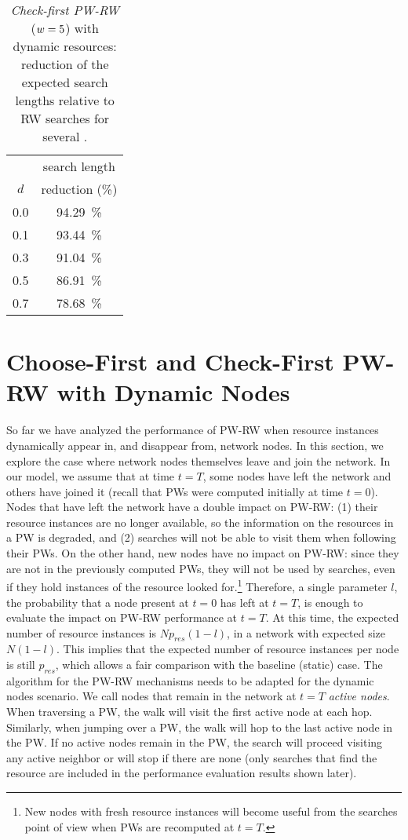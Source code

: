 \documentclass[]{elsarticle}
\newcommand{\pnoderes}  {\ensuremath{p_{res}}}
\begin{document}
\begin{table}
\centering
\begin{tabular}{|c|c|}
\hline
\rule{0pt}{11pt}   & search length \\ 
              $d$  & reduction (\%)\\ \hline
              0.0  &  94.29~\%\\
              0.1  & 93.44~\%\\
              0.3  & 91.04~\%\\
              0.5  & 86.91~\%\\
              0.7  & 78.68~\%\\
\hline
\end{tabular}
\caption{\emph{Check-first PW-RW} ($w=5$) with dynamic resources: reduction of the expected search lengths relative to RW searches for several \pd.}
\label{tab:H_reduction_RW_PWRW2}
\end{table}


\section{Choose-First and Check-First PW-RW with Dynamic Nodes}
\label{sec:dyn_nodes}

So far we have analyzed the performance of PW-RW when resource instances dynamically appear in, and disappear from, network nodes. In this section, we explore the case where network nodes themselves leave and join the network. In our model, we assume that at time $t\!=\!T$, some nodes have left the network and others have joined it (recall that PWs were computed initially at time $t\!=\!0$).  Nodes that have left the network have a double impact on PW-RW: (1) their resource instances are no longer available, so the information on the resources in a PW is degraded, and (2) searches will not be able to visit them when following their PWs. On the other hand, new nodes have no impact on PW-RW: since they are not in the previously computed PWs, they will not be used by searches, even if they hold instances of the resource looked for.\footnote{New nodes with fresh resource instances will become useful from the searches point of view when PWs are recomputed at $t\!=\!T$.} Therefore, a single parameter $l$, the probability that a node present at $t\!=\!0$ has left at $t\!=\!T$, is enough to evaluate the impact on PW-RW performance at $t\!=\!T$. At this time, the expected number of resource instances is $N\pnoderes(1-l)$, in a network with expected size $N(1-l)$. This implies that the expected number of resource instances per node is still $\pnoderes$, which allows a fair comparison with the baseline (static) case.
The algorithm for the PW-RW mechanisms needs to be adapted for the dynamic nodes scenario. We call nodes that remain in the network at $t\!=\!T$ \emph{active nodes}. When traversing a PW, the walk will visit the first active node at each hop. Similarly, when jumping over a PW, the walk will hop to the last active node in the PW. If no active nodes remain in the PW, the search will proceed visiting any active neighbor or will stop if there are none (only searches that find the resource are included in the performance evaluation results shown later).
\end{document}

